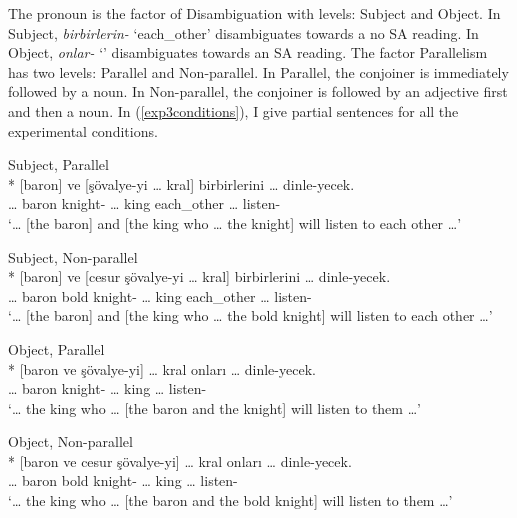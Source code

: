 The pronoun is the factor of Disambiguation with levels: Subject and Object. In Subject, \textit{birbirlerin-{\Case}} `each\_other' disambiguates towards a no SA reading. In Object, \textit{onlar-{\Case}} `{\Tpl}' disambiguates towards an SA reading. The factor Parallelism has two levels: Parallel and Non-parallel. In Parallel, the conjoiner is immediately followed by a noun. In Non-parallel, the conjoiner is followed by an adjective first and then a noun. In (\ref{exp3conditions}), I give partial sentences for all the experimental conditions.
\begin{exe}
\ex \label{exp3conditions}
\begin{xlist}
    \ex Subject, Parallel\\* 
    \gll {\ldots} [baron] ve [şövalye-yi {\ldots} kral] birbirlerini {\ldots} dinle-yecek. \\ 
    {\ldots} baron {\And} knight-{\Acc} {\ldots} king each\_other {\ldots} listen-{\Fut} \\
    \glt `{\ldots} [the baron] and [the king who {\ldots} the knight] will listen to each other {\ldots}'
    
    \ex Subject, Non-parallel\\* 
    \gll {\ldots} [baron] ve [cesur şövalye-yi {\ldots} kral] birbirlerini {\ldots} dinle-yecek. \\ 
    {\ldots} baron {\And} bold knight-{\Acc} {\ldots} king each\_other {\ldots} listen-{\Fut} \\
    \glt `{\ldots} [the baron] and [the king who {\ldots} the bold knight] will listen to each other {\ldots}'
    
    \ex Object, Parallel\\* 
    \gll {\ldots} [baron ve şövalye-yi] {\ldots} kral onları {\ldots} dinle-yecek. \\ 
    {\ldots} baron {\And} knight-{\Acc} {\ldots} king {\Tpl} {\ldots} listen-{\Fut} \\
    \glt `{\ldots} the king who {\ldots} [the baron and the knight] will listen to them {\ldots}'
    
    \ex Object, Non-parallel\\*
    \gll {\ldots} [baron ve cesur şövalye-yi] {\ldots} kral onları {\ldots} dinle-yecek. \\ 
    {\ldots} baron {\And} bold knight-{\Acc} {\ldots} king {\Tpl} {\ldots} listen-{\Fut} \\
    \glt `{\ldots} the king who {\ldots} [the baron and the bold knight] will listen to them {\ldots}'
\end{xlist}
\end{exe}

